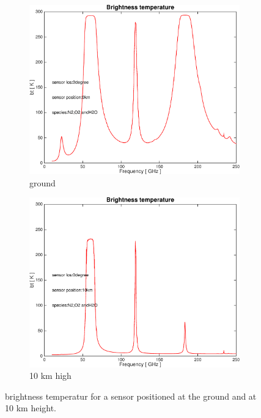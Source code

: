\documentclass[paper=a4, fontsize=11pt]{scrartcl} %
\begin{document}
\begin{figure}[h]
 \centering
 \begin{subfigure}[h!]{0.46\textwidth}
 \includegraphics[width=\textwidth]{plots/bt_N2+O2+H2O_0km_0deg.pdf}
 \caption{ground}
 \end{subfigure}
 \begin{subfigure}[h!]{0.45\textwidth}
 \includegraphics[width=\textwidth]{plots/bt_N2+O2+H2O_10km_0deg.pdf}
 \caption{10 km high}
 \end{subfigure}
 \caption{brightness temperatur for a sensor positioned at the ground and at 10 km height. }
 \label{figure:abs_pressure}
\end{figure}
\end{document}
